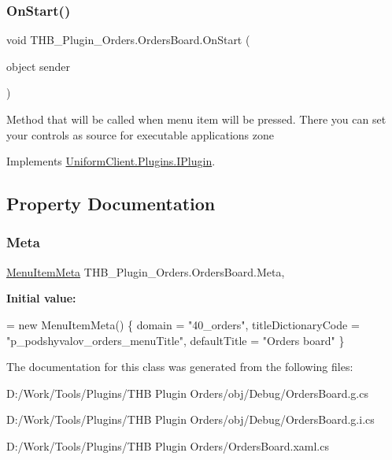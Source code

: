 \subsubsection{\texorpdfstring{On\+Start()}{OnStart()}}
{\footnotesize\ttfamily void T\+H\+B\+\_\+\+Plugin\+\_\+\+Orders.\+Orders\+Board.\+On\+Start (\begin{DoxyParamCaption}\item[{object}]{sender }\end{DoxyParamCaption})}



Method that will be called when menu item will be pressed. There you can set your controls as source for executable application\textquotesingle{}s zone 



Implements \mbox{\hyperlink{interface_uniform_client_1_1_plugins_1_1_i_plugin_a1ca2220c7ce4a23f8f41af10efccf328}{Uniform\+Client.\+Plugins.\+I\+Plugin}}.



\subsection{Property Documentation}
\mbox{\label{class_t_h_b___plugin___orders_1_1_orders_board_a29aa5cbda92c3d6558e51a51c687d4a1}} 
\subsubsection{\texorpdfstring{Meta}{Meta}}
{\footnotesize\ttfamily \mbox{\hyperlink{class_uniform_client_1_1_plugins_1_1_menu_item_meta}{Menu\+Item\+Meta}} T\+H\+B\+\_\+\+Plugin\+\_\+\+Orders.\+Orders\+Board.\+Meta\hspace{0.3cm}{\ttfamily [get]}, {\ttfamily [set]}}

{\bfseries Initial value\+:}
\begin{DoxyCode}
= \textcolor{keyword}{new} MenuItemMeta()
        \{
            domain = \textcolor{stringliteral}{"40\_orders"},
            titleDictionaryCode = \textcolor{stringliteral}{"p\_podshyvalov\_orders\_menuTitle"},
            defaultTitle = \textcolor{stringliteral}{"Orders board"}
        \}
\end{DoxyCode}


The documentation for this class was generated from the following files\+:\begin{DoxyCompactItemize}
\item 
D\+:/\+Work/\+Tools/\+Plugins/\+T\+H\+B Plugin Orders/obj/\+Debug/Orders\+Board.\+g.\+cs\item 
D\+:/\+Work/\+Tools/\+Plugins/\+T\+H\+B Plugin Orders/obj/\+Debug/Orders\+Board.\+g.\+i.\+cs\item 
D\+:/\+Work/\+Tools/\+Plugins/\+T\+H\+B Plugin Orders/Orders\+Board.\+xaml.\+cs\end{DoxyCompactItemize}
